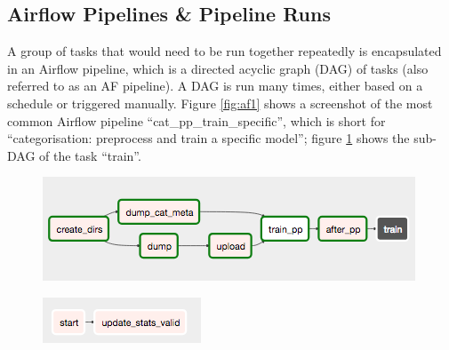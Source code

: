 \subsection{Airflow Pipelines \& Pipeline Runs}

A group of tasks that would need to be run together repeatedly is encapsulated in an Airflow pipeline, which is a directed acyclic graph (DAG) of tasks (also referred to as an AF pipeline).
A DAG is run many times, either based on a schedule or triggered manually.
Figure \ref{fig:af1} shows a screenshot of the most common Airflow pipeline ``cat\_pp\_train\_specific'', which is short for ``categorisation: preprocess and train a specific model''; figure \ref{fig:af2} shows the sub-DAG of the task ``train''.

\begin{figure}
\centering
\begin{minipage}{.48\textwidth}
  \centering
  \includegraphics[width=1.0\linewidth]{figures/af_train_specific}
  \label{fig:af1}
\end{minipage}%
\begin{minipage}{.48\textwidth}
  \centering
  \includegraphics[width=.6\linewidth]{figures/af_train}
  \label{fig:af2}
\end{minipage}
\end{figure}

